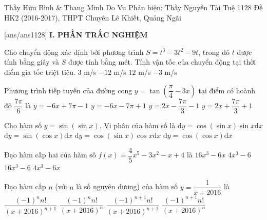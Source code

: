 \begin{name}
{Thầy Hữu Bình \& Thang Minh Do Vu \newline Phản biện: Thầy Nguyễn Tài Tuệ}
{1128 Đề HK2 (2016-2017), THPT Chuyên Lê Khiết, Quảng Ngãi}
	\end{name}
	\setcounter{ex}{0}\setcounter{bt}{0}
	[ans/ans1128]
\noindent\textbf{I. PHẦN TRẮC NGHIỆM}
\begin{ex}%
	Cho chuyển động xác định bởi phương trình $S=t^3-3t^2-9t$, trong đó $t$ được tính bằng giây và $S$ được tính bằng mét. Tính vận tốc của chuyển động tại thời điểm gia tốc triệt tiêu.
	\choice
	{$3$ m/s}
	{\True $-12$ m/s}
	{$12$ m/s}
	{$-3$ m/s}
\end{ex}
\begin{ex}%
	Phương trình tiếp tuyến của đường cong $y=\tan \left(\dfrac{\pi}{4}-3x\right)$ tại điểm có hoành độ $\dfrac{7\pi}{6}$ là
	\choice
	{\True $y=-6x+7\pi-1$}
	{$y=-6x-7\pi+1$}
	{$y=2x-\dfrac{7\pi}{3}-1$}
	{$y=2x+\dfrac{7\pi}{3}+1$}
\end{ex}
\begin{ex}%
	Cho hàm số $y=\sin (\sin x)$. Vi phân của hàm số là
	\choice
	{$\mathrm{d}y=\cos (\sin x)\sin x \mathrm{d}x$}
	{$\mathrm{d}y=\sin(\cos x)\mathrm{d}x$}
	{\True $\mathrm{d}y=\cos (\sin x)\cos x\mathrm{d}x$}
	{$\mathrm{d}y=\cos(\cos x)\mathrm{d}x$}
\end{ex}
\begin{ex}%
	Đạo hàm cấp hai của hàm số $f(x)=\dfrac{4}{5}x^5-3x^2-x+4$ là
	\choice
	{$16x^3-6x$}
	{$4x^3-6$}
	{\True $16x^3-6$}
	{$4x^3-6x$}
\end{ex}
\begin{ex}%
	Đạo hàm cấp $n$ (với $n$ là số nguyên dương) của hàm số $y=\dfrac{1}{x+2016}$ là
	\choice
	{\True $\dfrac{(-1)^nn!}{(x+2016)^{n+1}}$}
	{$\dfrac{(-1)^nn!}{(x+2016)^{n}}$}
	{$\dfrac{(-1)^{n+1}n!}{(x+2016)^{n+1}}$}
	{$\dfrac{(-1)^{n+1}n!}{(x+2016)^{n}}$}
\end{ex}
